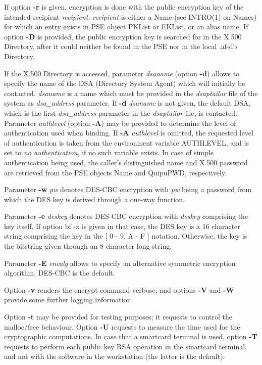 If option {\bf -r} is given, encryption is done with the public encryption key
of the intended recipient {\em recipient}. {\em recipient} is either a Name (see INTRO(1) on Names)
for which an entry exists in PSE object PKList or EKList, or an alias name. If option {\bf -D}
is provided, the public encryption key is searched for in the X.500 Directory, after it could
neither be found in the PSE nor in the local .af-db Directory.
 
If the X.500 Directory is accessed, parameter {\em dsaname} (option {\bf -d}) allows to specify the name of the DSA (Directory System Agent) which
will initially be contacted. {\em dsaname} is a name which must be provided in the 
{\em dsaptailor} file of the system as {\em dsa\_address} parameter. If {\bf -d} {\em dsaname} is
not given, the default DSA, which is the first {\em dsa\_address} parameter in the {\em dsaptailor} 
file, is contacted.
Parameter {\em authlevel} (option {\bf -A}) may be provided to determine the level of authentication used when binding. If {\bf -A} {\em authlevel} is omitted, the requested 
level of authentication is taken from the environment variable AUTHLEVEL, and is set to {\em no 
authentication}, if no such variable exists.
In case of simple authentication being used, the caller's distinguished name and
X.500 password are retrieved from the PSE objects Name and QuipuPWD, respectively.
 
Parameter {\bf -w} {\em pw} denotes DES-CBC encryption with {\em pw} being a password from which the 
DES key 
is derived through a one-way function.
 
Parameter {\bf -e} {\em deskey} denotes DES-CBC encryption with {\em deskey} comprising the key itself.
If option {bf -x} is given in that case, the DES key is a 16 character string comprising
the key in the [ 0 - 9, A - F ] notation. Otherwise, the key is the bitstring given through
an 8 character long string.

Parameter {\bf -E} {\em encalg} allows to specify an alternative symmetric encryption algorithm.
DES-CBC is the default.

Option {\bf -v} renders the encrypt command verbose, and options {\bf -V} and {\bf -W} provide
some further logging information.

Option {\bf -t} may be provided for testing purposes; it requests to control the malloc/free behaviour.
Option {\bf -U} requests to measure the time used for the cryptographic computations. 
In case that a smartcard terminal is used, option {\bf -T} requests to perform each public key 
RSA operation in the smartcard terminal, and not with the software in the workstation 
(the latter is the default). 
\\ [1em]


